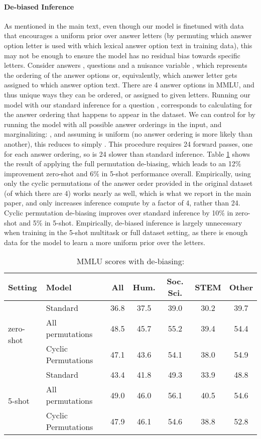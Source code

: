 \documentclass[10pt]{article} \usepackage[preprint]{tmlr}
\begin{document}
\paragraph{De-biased Inference} As mentioned in the main text, even though our model is finetuned with data that encourages a uniform prior over answer letters (by permuting which answer option letter is used with which lexical answer option text in training data), this may not be enough to ensure the model has no residual bias towards specific letters.
Consider answers , questions  and a nuisance variable , which represents the ordering of the answer options or, equivalently, which answer letter gets assigned to which answer option text.
There are 4 answer options in MMLU, and thus  unique ways they can be ordered, or assigned to given letters.
Running our model with our standard inference for a question , corresponds to calculating  for the answer ordering  that happens to appear in the dataset.
We can control for  by running the model with all possible answer orderings in the input, and marginalizing: , and assuming   is uniform (no answer ordering is more likely than another), this reduces to simply . This procedure requires 24 forward passes, one for each answer ordering, so is 24  slower than standard inference. 
Table \ref{tab:mmlu_debiasing} shows the result of applying the full permutation de-biasing, which leads to an 12\% improvement zero-shot and 6\% in 5-shot performance overall.   
Empirically, using only the cyclic permutations of the answer order provided in the original dataset (of which there are 4) works nearly as well, which is what we report in the main paper, and only increases inference compute by a factor of 4, rather than 24. Cyclic permutation de-biasing improves over standard inference by 10\% in zero-shot and 5\% in 5-shot.
Empirically, de-biased inference is largely unnecessary when training in the 5-shot multitask or full dataset setting, as there is enough data for the model to learn a more uniform prior over the letters.


\begin{table}[t]
  \centering
  \caption{MMLU scores with de-biasing:}
  \label{tab:mmlu_debiasing}
  \vspace{0.5em}
  \small
  \begin{tabular}{ll c cccc}
    \toprule
    Setting& Model  & All  & Hum. & Soc. Sci. & STEM & Other \\
    \midrule
\multirow{3}{*}{zero-shot}
& Standard &36.8	&37.5&	39.0&	30.2&	39.7\\
&All permutations& 48.5&	45.7&	55.2&	39.4&	54.4\\
& Cyclic Permutations& 47.1&	43.6&	54.1&	38.0&	54.9\\
    \midrule
    \multirow{3}{*}{5-shot}
& Standard & 43.4 &	41.8&	49.3&	33.9&	48.8    \\
& All permutations & 49.0&	46.0&	56.1&	40.5&	54.6    \\
& Cyclic Permutations & 47.9&	46.1&	54.6&	38.8&	52.8    \\

    \bottomrule
  \end{tabular}
\end{table}
\end{document}
